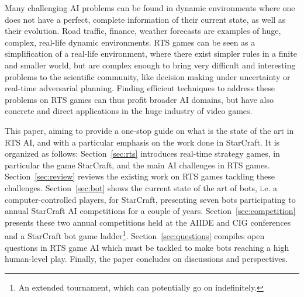 \documentclass[journal]{IEEEtran}
\begin{document}
Many  challenging AI  problems can  be found  in  dynamic environments
where  one does  not have  a  perfect, complete  information of  their
current  state, as well  as their  evolution.  Road  traffic, finance,
weather  forecasts are  examples of  huge, complex,  real-life dynamic
environments. RTS games can be seen as a simplification of a real-life
environment, where there  exist simpler rules in a  finite and smaller
world, but are complex enough  to bring very difficult and interesting
problems  to  the scientific  community,  like  decision making  under
uncertainty  or  real-time adversarial planning.   Finding  efficient  techniques
to address these problems  on  RTS  games can  thus  profit broader  AI
domains, but  have also concrete  and direct applications in  the huge
industry of  video games.

This paper, aiming to provide a one-stop guide on what is the state of
the art in RTS AI, and with a particular emphasis on the work done in StarCraft. 
It is organized as follows: Section~\ref{sec:rts}
introduces real-time strategy games, in particular the game StarCraft,
and  the main  AI challenges  in RTS  games.  Section~\ref{sec:review}
reviews  the existing  work on  RTS games  tackling  these challenges.
Section~\ref{sec:bot} shows  the current state  of the art of bots, i.e. a computer-controlled players, 
for  StarCraft, presenting  seven bots participating  to annual
StarCraft    AI    competitions     for    a    couple    of    years.
Section~\ref{sec:competition}  presents these two  annual competitions
held  at the AIIDE  and CIG  conferences and a StarCraft bot game ladder\footnote{An extended tournament, which can potentially go on indefinitely.}.  Section~\ref{sec:questions}
compiles open questions  in RTS game AI which must  be tackled to make
bots reaching a high human-level play.
Finally, the paper concludes on discussions and perspectives.


\end{document}

